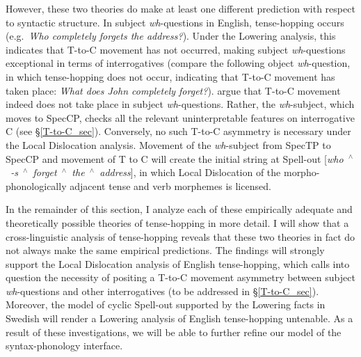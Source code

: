 However, these two theories do make at least one different prediction with respect to syntactic structure. In subject \textit{wh}-questions in English, tense-hopping occurs (e.g.\ \textit{Who completely forgets the address?}). Under the Lowering analysis, this indicates that T-to-C movement has not occurred, making subject \textit{wh}-questions exceptional in terms of interrogatives (compare the following object \textit{wh}-question, in which tense-hopping does not occur, indicating that T-to-C movement has taken place: \textit{What does John completely forget?}). \citet{pesetsky_torrego2001} argue that T-to-C movement indeed does not take place in subject \textit{wh}-questions. Rather, the \textit{wh}-subject, which moves to SpecCP, checks all the relevant uninterpretable features on interrogative C (see \S\ref{T-to-C_sec}). Conversely, no such T-to-C asymmetry is necessary under the Local Dislocation analysis. Movement of the \textit{wh}-subject from SpecTP to SpecCP and movement of T to C will create the initial string at Spell-out [\textit{who~$^{\wedge}$~-s~$^{\wedge}$~forget~$^{\wedge}$~the~$^{\wedge}$~address}], in which Local Dislocation of the morpho-phonologically adjacent tense and verb morphemes is licensed.

In the remainder of this section, I analyze each of these empirically adequate and theoretically possible theories of tense-hopping in more detail. I will show that a cross-linguistic analysis of tense-hopping reveals that these two theories in fact do not always make the same empirical predictions. The findings will strongly support the Local Dislocation analysis of English tense-hopping, which calls into question the necessity of positing a T-to-C movement asymmetry between subject \textit{wh}-questions and other interrogatives (to be addressed in \S\ref{T-to-C_sec}). Moreover, the model of cyclic Spell-out supported by the Lowering facts in Swedish will render a Lowering analysis of English tense-hopping untenable. As a result of these investigations, we will be able to further refine our model of the syntax-phonology interface.

